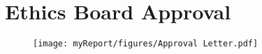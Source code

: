 \chapter{Ethics Board Approval}

\begin{figure}[H]
\texttt{[image: myReport/figures/Approval Letter.pdf]}
\end{figure}